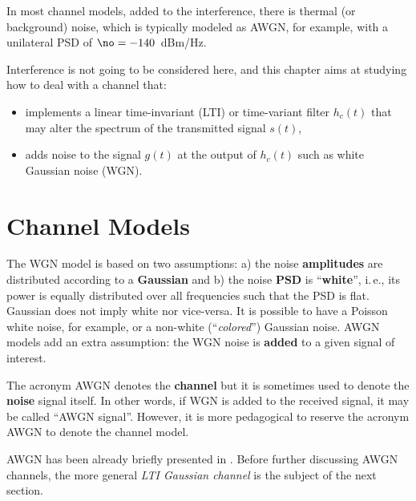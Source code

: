 
In most channel models, added to the interference, there is thermal (or background) noise, which is %
typically modeled as AWGN, for example, with a unilateral PSD of $\no = -140$~dBm/Hz.

Interference is not going to be considered here, and this chapter aims at studying how to deal with a channel that: 
\begin{itemize}
\item implements a linear time-invariant (LTI) or time-variant  filter $h_c(t)$ that may alter the spectrum of the transmitted signal $s(t)$,
\item adds noise to the signal $g(t)$ at the output of $h_c(t)$ such as white Gaussian noise (WGN).
\end{itemize}

\section{Channel Models}
\label{sec:channelModels}



The WGN model is based on two assumptions: a) the noise \textbf{amplitudes} are distributed according to a \textbf{Gaussian} and b) the noise \textbf{PSD} is ``\textbf{white}'', i.\,e., its power is equally distributed over all frequencies such that the PSD is flat. Gaussian does not imply white nor vice-versa. It is possible to have a Poisson white noise, for example, or a non-white (``\emph{colored}'') Gaussian noise.
AWGN models add an extra assumption: the WGN noise is \textbf{added} to a given signal of interest.

The acronym AWGN denotes the \textbf{channel} but it is sometimes used to denote the \textbf{noise} signal itself. In other words, if WGN is added to the received signal, it may be called ``AWGN signal''. However, it is more pedagogical to reserve the acronym AWGN to denote the channel model. 

AWGN has been already briefly presented in .
Before further discussing AWGN channels, the more general \emph{LTI Gaussian channel} is the subject of the next section.

